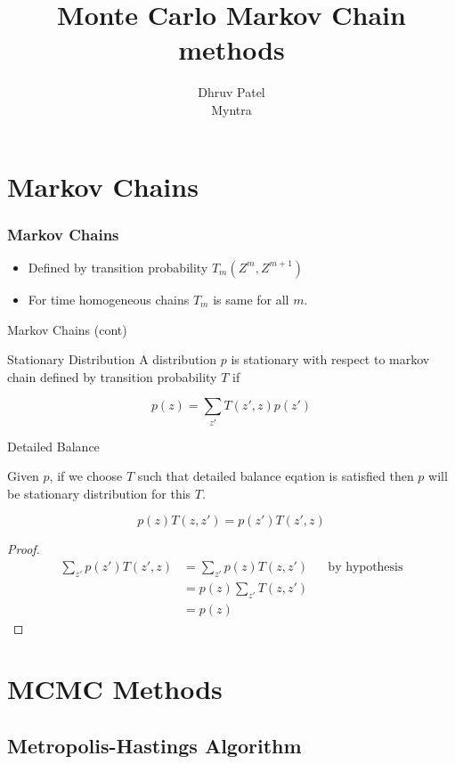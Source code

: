 \documentclass[pdf]{beamer}
\title{Monte Carlo Markov Chain methods}
\author[Dhruv Patel]{Dhruv Patel \\ Myntra}
\begin{document}
\begin{frame}
  \titlepage
\end{frame}

\section{Markov Chains}
\begin{frame}
  \frametitle{Markov Chains}
  \begin{itemize}
  \item  Defined by transition probability $T_m(Z^m, Z^{m+1})$
  \item For time homogeneous chains $T_m$ is same for all $m$.
  \end{itemize}
\end{frame}

\begin{frame}{Markov Chains (cont)}
  \begin{block}{Stationary Distribution}
    A distribution $p$ is stationary with respect to markov chain defined by transition probability $T$ if
    
    \[
      p(z) = \sum_{z'}T(z', z) p(z')
    \]
  \end{block}
\end{frame}

\begin{frame}{Detailed Balance}

  \begin{theorem}
    Given $p$, if we choose $T$ such that detailed balance eqation is satisfied then $p$ will be stationary distribution for this $T$.
    
    \[
      p(z)T(z, z') = p(z')T(z', z)  
    \]
  \end{theorem}
  \begin{proof}
    \begin{align*}
      \sum_{z'} p(z') T(z', z) &= \sum_{z'} p(z) T(z, z')  && \text{by hypothesis} \\
                               &= p(z) \sum_{z'}T(z, z') \\
                               &= p(z)
    \end{align*}
  \end{proof}
\end{frame}

\section{MCMC Methods}
\subsection{Metropolis-Hastings Algorithm}
\end{document}
